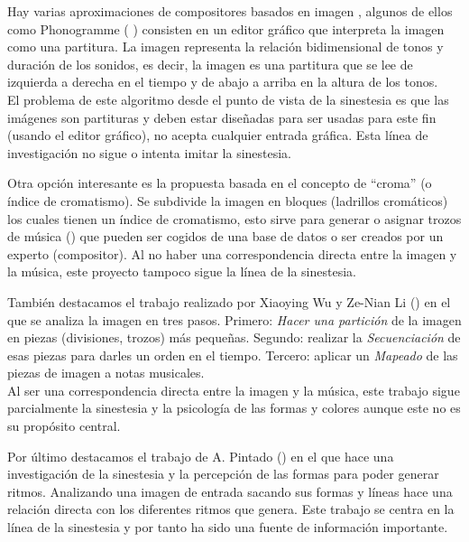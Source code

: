 Hay varias aproximaciones de compositores basados en imagen , algunos de ellos como Phonogramme (\cite{ImageBaseComposition} \cite{Phonogramme}) consisten en un editor gráfico que interpreta la imagen como una partitura. \color{blue} La imagen representa la relación bidimensional de tonos y duración de los sonidos, es decir, la imagen es una partitura que se lee de izquierda a derecha en el tiempo y de abajo a arriba en la altura de los tonos. 
\\El problema de este algoritmo desde el punto de vista de la sinestesia es que las imágenes son partituras y deben estar diseñadas para ser usadas para este fin (usando el editor gráfico), no acepta cualquier entrada gráfica. Esta línea de investigación no sigue o intenta imitar la sinestesia.\\ \color{black}

Otra opción interesante es la propuesta basada en el concepto de ``croma'' (o índice de cromatismo). Se subdivide la imagen en bloques (ladrillos cromáticos) los cuales tienen un índice de cromatismo, esto sirve para generar o asignar trozos de música (\cite{bricksConvertsMusic}) que pueden ser cogidos de una base de datos o ser creados por un experto (compositor). \color{blue} Al no haber una correspondencia directa entre la imagen y la música, este proyecto tampoco sigue la línea de la sinestesia.\\ \color{black}

También destacamos el trabajo realizado por Xiaoying Wu y Ze-Nian Li (\cite{ImageBaseComposition}) en el que se analiza la imagen en tres pasos. Primero: \emph{Hacer una partición} de la imagen en piezas (divisiones, trozos) más pequeñas. Segundo: realizar la \emph{Secuenciación} de esas piezas para darles un orden en el tiempo. Tercero: aplicar un \emph{Mapeado} de las piezas de imagen a notas musicales. \color{blue} 
\\Al ser una correspondencia directa entre la imagen y la música, este trabajo sigue parcialmente la sinestesia y la psicología de las formas y colores aunque este no es su propósito central.\\ \color{black}

\color{blue}
Por último destacamos el trabajo de A. Pintado (\cite{portutesis}) en el que hace una investigación de la sinestesia y la percepción de las formas para poder generar ritmos. Analizando una imagen de entrada sacando sus formas y líneas hace una relación directa con los diferentes ritmos que genera. Este trabajo se centra en la línea de la sinestesia y por tanto ha sido una fuente de información importante. \color{black}

